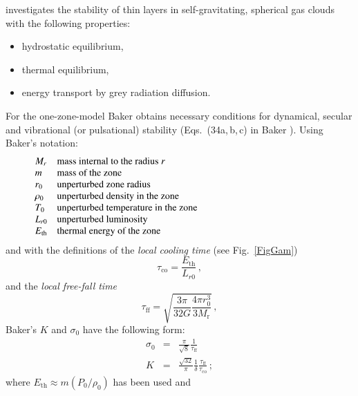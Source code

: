 \documentclass{aa}
\begin{document}
   \citet{baker} investigates the stability of thin layers in
   self-gravitating,
   spherical gas clouds with the following properties:
   \begin{itemize}
      \item hydrostatic equilibrium,
      \item thermal equilibrium,
      \item energy transport by grey radiation diffusion.
   \end{itemize}
   For the one-zone-model Baker obtains necessary conditions
   for dynamical, secular and vibrational (or pulsational)
   stability (Eqs.\ (34a,\,b,\,c) in Baker \citeyear{baker}). Using Baker's
   notation:
   \[
      \begin{array}{lp{0.8\linewidth}}
         M_{r}  & mass internal to the radius $r$     \\
         m               & mass of the zone                    \\
         r_0             & unperturbed zone radius             \\
         \rho_0          & unperturbed density in the zone     \\
         T_0             & unperturbed temperature in the zone \\
         L_{r0}          & unperturbed luminosity              \\
         E_{\mathrm{th}} & thermal energy of the zone
      \end{array}
   \]
\noindent
   and with the definitions of the \emph{local cooling time\/}
   (see Fig.~\ref{FigGam})
   \begin{equation}
      \tau_{\mathrm{co}} = \frac{E_{\mathrm{th}}}{L_{r0}} \,,
   \end{equation}
   and the \emph{local free-fall time}
   \begin{equation}
      \tau_{\mathrm{ff}} =
         \sqrt{ \frac{3 \pi}{32 G} \frac{4\pi r_0^3}{3 M_{\mathrm{r}}}
}\,,
   \end{equation}
   Baker's $K$ and $\sigma_0$ have the following form:
   \begin{eqnarray}
      \sigma_0 & = & \frac{\pi}{\sqrt{8}}
                     \frac{1}{ \tau_{\mathrm{ff}}} \\
      K        & = & \frac{\sqrt{32}}{\pi} \frac{1}{\delta}
                        \frac{ \tau_{\mathrm{ff}} }
                             { \tau_{\mathrm{co}} }\,;
   \end{eqnarray}
   where $ E_{\mathrm{th}} \approx m (P_0/{\rho_0})$ has been used and
\end{document}
